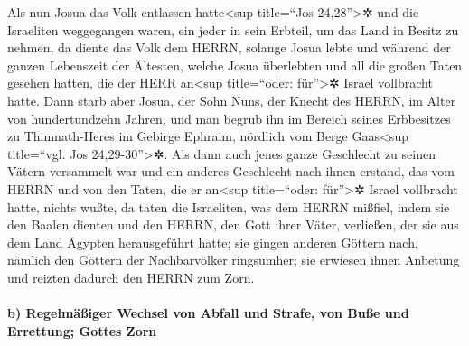 Als nun Josua das Volk entlassen hatte\textless sup
title=``Jos 24,28''\textgreater✲ und die Israeliten weggegangen waren,
ein jeder in sein Erbteil, um das Land in Besitz zu nehmen,
da diente das Volk dem HERRN, solange Josua lebte und
während der ganzen Lebenszeit der Ältesten, welche Josua überlebten und
all die großen Taten gesehen hatten, die der HERR an\textless sup
title=``oder: für''\textgreater✲ Israel vollbracht hatte.
Dann starb aber Josua, der Sohn Nuns, der Knecht des
HERRN, im Alter von hundertundzehn Jahren, und man begrub
ihn im Bereich seines Erbbesitzes zu Thimnath-Heres im Gebirge Ephraim,
nördlich vom Berge Gaas\textless sup title=``vgl. Jos
24,29-30''\textgreater✲. Als dann auch jenes ganze
Geschlecht zu seinen Vätern versammelt war und ein anderes Geschlecht
nach ihnen erstand, das vom HERRN und von den Taten, die er
an\textless sup title=``oder: für''\textgreater✲ Israel vollbracht
hatte, nichts wußte, da taten die Israeliten, was dem
HERRN mißfiel, indem sie den Baalen dienten und den
HERRN, den Gott ihrer Väter, verließen, der sie aus dem Land Ägypten
herausgeführt hatte; sie gingen anderen Göttern nach, nämlich den
Göttern der Nachbarvölker ringsumher; sie erwiesen ihnen Anbetung und
reizten dadurch den HERRN zum Zorn.

\hypertarget{b-regelmuxe4uxdfiger-wechsel-von-abfall-und-strafe-von-buuxdfe-und-errettung-gottes-zorn}{%
\paragraph{b) Regelmäßiger Wechsel von Abfall und Strafe, von Buße und
Errettung; Gottes
Zorn}\label{b-regelmuxe4uxdfiger-wechsel-von-abfall-und-strafe-von-buuxdfe-und-errettung-gottes-zorn}}

